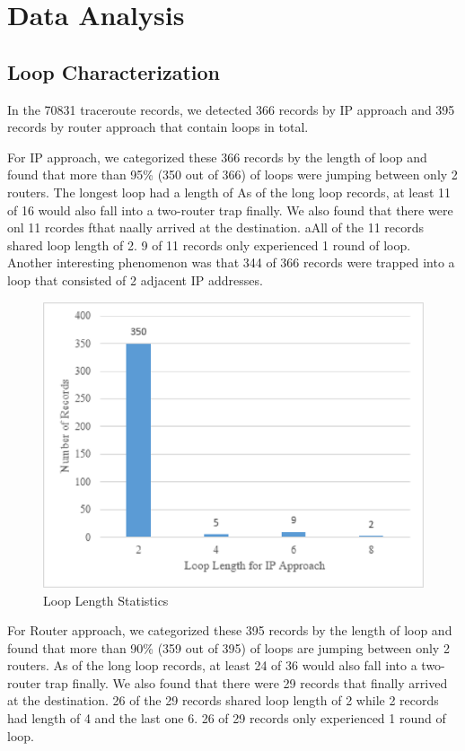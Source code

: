 \documentclass[conference, twocolumn, oneside, 10pt]{IEEEtran}
\begin{document}
\section{Data Analysis}
\label{sec:sec6}

\subsection{Loop Characterization}
 
In the 70831 traceroute records, we detected 366 records by IP approach and 395 records by router approach that contain loops in total. 

For IP approach, we categorized these 366 records by the length of loop and found that more than 95\% (350 out of 366) of loops were jumping between only 2 routers. The longest loop had a length of As of the long loop records, at least 11 of 16 would also fall into a two-router trap finally. We also found that there were onl 11 rcordes fthat naally arrived at the destination. aAll of the 11 records shared loop length of 2. 9 of 11 records only experienced 1 round of loop. Another interesting phenomenon was that 344 of 366 records were trapped into a loop that consisted of 2 adjacent IP addresses.

\begin{figure}[h!]
\centering
\includegraphics[scale=0.4]{plot/loop_length1.eps}
\caption{Loop Length Statistics}
\label{fig:asdf1}
\end{figure}

For Router approach, we categorized these 395 records by the length of loop and found that more than 90\% (359 out of 395) of loops are jumping between only 2 routers. As of the long loop records, at least 24 of 36 would also fall into a two-router trap finally. We also found that there were 29 records that finally arrived at the destination. 26 of the 29 records shared loop length of 2 while 2 records had length of 4 and the last one 6. 26 of 29 records only experienced 1 round of loop.
\end{document}
